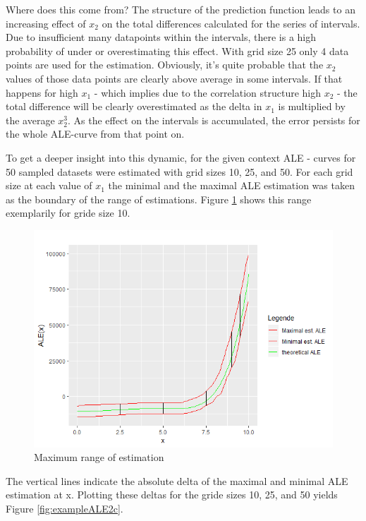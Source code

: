 \documentclass[]{krantz}
\begin{document}
Where does this come from? The structure of the prediction function
leads to an increasing effect of \(x_2\) on the total differences
calculated for the series of intervals. Due to insufficient many
datapoints within the intervals, there is a high probability of under or
overestimating this effect. With grid size 25 only 4 data points are
used for the estimation. Obviously, it's quite probable that the \(x_2\)
values of those data points are clearly above average in some intervals.
If that happens for high \(x_1\) - which implies due to the correlation
structure high \(x_2\) - the total difference will be clearly
overestimated as the delta in \(x_1\) is multiplied by the average
\(x_2^3\). As the effect on the intervals is accumulated, the error
persists for the whole ALE-curve from that point on.

To get a deeper insight into this dynamic, for the given context ALE -
curves for 50 sampled datasets were estimated with grid sizes 10, 25,
and 50. For each grid size at each value of \(x_1\) the minimal and the
maximal ALE estimation was taken as the boundary of the range of
estimations. Figure \ref{fig:exampleALE2b} shows this range exemplarily
for gride size 10.

\begin{figure}
\includegraphics[width=1\linewidth]{images/ALE_2_ALErange_10_} \caption{Maximum range of estimation}\label{fig:exampleALE2b}
\end{figure}



The vertical lines indicate the absolute delta of the maximal and
minimal ALE estimation at x. Plotting these deltas for the gride sizes
10, 25, and 50 yields Figure \ref{fig:exampleALE2c}.
\end{document}
